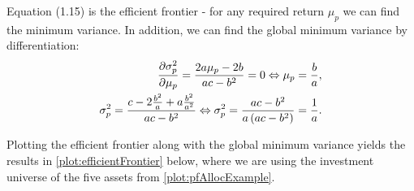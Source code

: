 \documentclass[11pt,a4paper,oneside]{article}
\newcommand{\LL}{\Leftrightarrow}
\newcommand{\lp}{\left(}
\newcommand{\rp}{\right)}
\begin{document}
Equation (1.15) is the efficient frontier - for any required return $\mu_p$ we can find the minimum variance. In addition, we can find the global minimum variance by differentiation:
\begin{align}
    \frac{\partial \sigma_p^2}{\partial \mu_p} = \frac{2a\mu_p - 2b}{ac - b^2} = 0\LL \mu_p = \frac{b}{a}, \notag\\
    \sigma_p^2 = \frac{c - 2 \frac{b^2}{a} + a \frac{b^2}{a^2}}{ac - b^2} \LL \sigma_p^2 = \frac{ac - b^2}{a\lp ac - b^2\rp} = \frac{1}{a}.
\end{align}

Plotting the efficient frontier along with the global minimum variance yields the results in \ref{plot:efficientFrontier} below, where we are using the investment universe of the five assets from \ref{plot:pfAllocExample}.

\printbibliography[heading=none]
\end{document}
